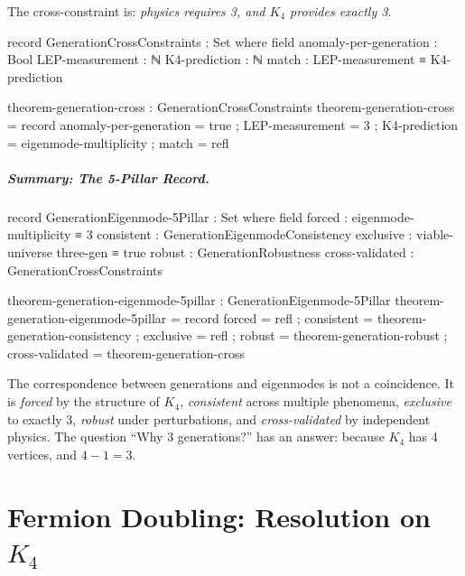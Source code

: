 \documentclass[11pt,a4paper]{book}
\begin{document}
The cross-constraint is: \emph{physics requires 3, and $K_4$ provides exactly 3}.

\begin{code}
record GenerationCrossConstraints : Set where
  field
    anomaly-per-generation : Bool
    LEP-measurement        : ℕ
    K4-prediction          : ℕ
    match                  : LEP-measurement ≡ K4-prediction

theorem-generation-cross : GenerationCrossConstraints
theorem-generation-cross = record
  { anomaly-per-generation = true
  ; LEP-measurement        = 3
  ; K4-prediction          = eigenmode-multiplicity
  ; match                  = refl
  }
\end{code}

\paragraph{Summary: The 5-Pillar Record.}

\begin{code}
record GenerationEigenmode-5Pillar : Set where
  field
    forced           : eigenmode-multiplicity ≡ 3
    consistent       : GenerationEigenmodeConsistency
    exclusive        : viable-universe three-gen ≡ true
    robust           : GenerationRobustness
    cross-validated  : GenerationCrossConstraints

theorem-generation-eigenmode-5pillar : GenerationEigenmode-5Pillar
theorem-generation-eigenmode-5pillar = record
  { forced          = refl
  ; consistent      = theorem-generation-consistency
  ; exclusive       = refl
  ; robust          = theorem-generation-robust
  ; cross-validated = theorem-generation-cross
  }
\end{code}

The correspondence between generations and eigenmodes is not a coincidence. It is \emph{forced} by the structure of $K_4$, \emph{consistent} across multiple phenomena, \emph{exclusive} to exactly 3, \emph{robust} under perturbations, and \emph{cross-validated} by independent physics. The question ``Why 3 generations?'' has an answer: because $K_4$ has 4 vertices, and $4 - 1 = 3$.

\chapter{Fermion Doubling: Resolution on \texorpdfstring{$K_4$}{K4}}
\label{chap:fermion-doubling}
\end{document}
